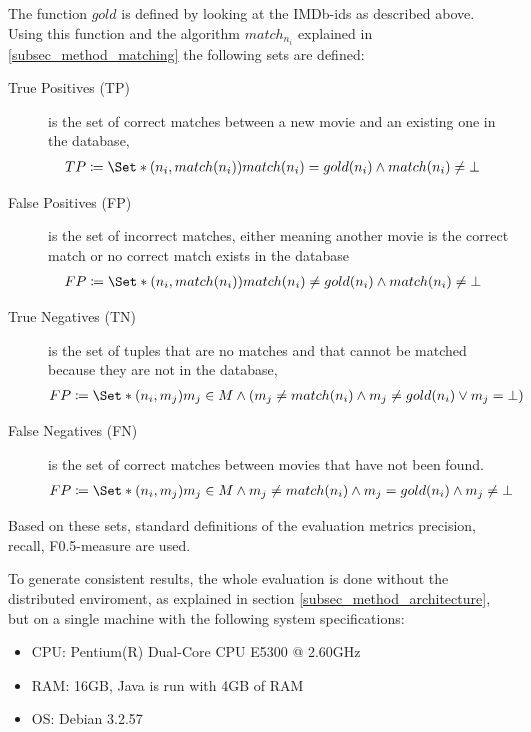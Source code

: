The function $gold$ is defined by looking at the IMDb-ids as described above.
Using this function and the algorithm $match_{n_{i}}$ explained in \ref{subsec_method_matching} the following sets are defined:

\begin{description}
\item[True Positives (TP)] is the set of correct matches between a new movie and an existing one in the database,
\begin{align}
TP &\coloneqq \Set*{(n_i, match(n_i))}{match(n_i) = gold(n_i) \land match(n_i) \neq \bot}
\end{align}
\item[False Positives (FP)] is the set of incorrect matches, either meaning another movie is the correct match or no correct match exists in the database
\begin{align}
FP &\coloneqq \Set*{(n_i, match(n_i))}{match(n_i) \neq gold(n_i) \land match(n_i) \neq \bot}
\end{align}\item[True Negatives (TN)] is the set of tuples that are no matches and that cannot be matched because they are not in the database,
\begin{align}
FP &\coloneqq \Set*{(n_i, m_j)}{m_j \in M \land (m_j \neq match(n_i) \land m_j \neq gold(n_i) \lor m_j = \bot)}
\end{align}
\item[False Negatives (FN)] is the set of correct matches between movies that have not been found.
\begin{align}
FP &\coloneqq \Set*{(n_i, m_j)}{m_j \in M \land m_j \neq match(n_i) \land m_j = gold(n_i) \land m_j \neq \bot}
\end{align}
\end{description}

Based on these sets, standard definitions of the evaluation metrics precision, recall, F0.5-measure are used.

To generate consistent results, the whole evaluation is done without the distributed enviroment, as explained in section \ref{subsec_method_architecture}, but on a single machine with the following system specifications:
\begin{itemize}
	\item CPU: Pentium(R) Dual-Core  CPU E5300  @ 2.60GHz
	\item RAM: 16GB, Java is run with 4GB of RAM
	\item OS: Debian 3.2.57
\end{itemize}

